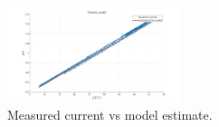 \begin{figure}[h]
    \centering
    \includegraphics[width=0.45\textwidth]{assets/Current model.png}
    \caption{Measured current vs model estimate.}
    \label{fig:voc_current_model}
\end{figure}
